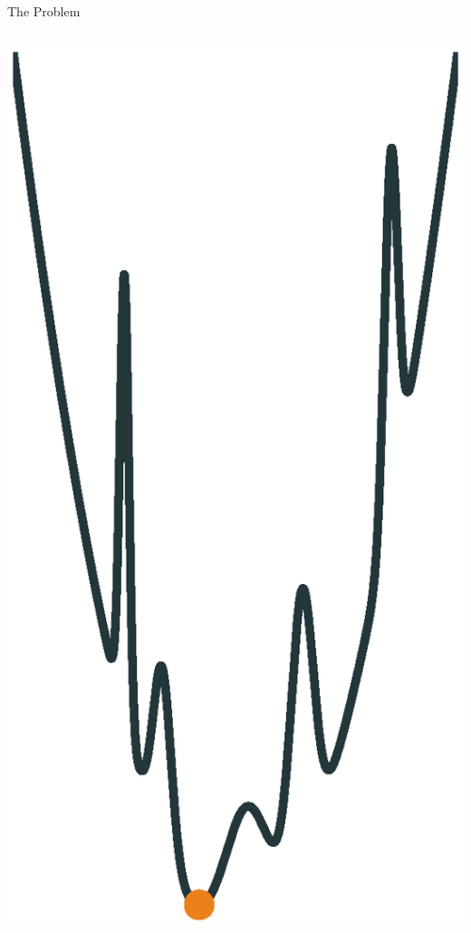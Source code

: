 \documentclass[10pt]{beamer}
\begin{document}
{\begin{frame}[fragile]{The Problem}
\begin{columns}{}
\begin{column}{0.45\textwidth}
\begin{overprint}
			    \includegraphics[width=0.9\linewidth]{images/globalmin.eps}

\end{overprint}
\end{column}
\end{columns}
\end{frame}}
\end{document}
